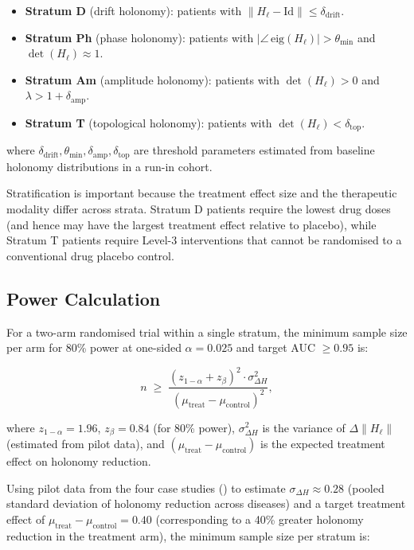 \begin{itemize}
  \item \textbf{Stratum D} (drift holonomy): patients with $\|H_\ell - \mathrm{Id}\| \leq \delta_{\mathrm{drift}}$.
  \item \textbf{Stratum Ph} (phase holonomy): patients with $|\angle\,\mathrm{eig}(H_\ell)| > \theta_{\mathrm{min}}$ and $\det(H_\ell) \approx 1$.
  \item \textbf{Stratum Am} (amplitude holonomy): patients with $\det(H_\ell) > 0$ and $\lambda > 1 + \delta_{\mathrm{amp}}$.
  \item \textbf{Stratum T} (topological holonomy): patients with $\det(H_\ell) < \delta_{\mathrm{top}}$.
\end{itemize}

\noindent where $\delta_{\mathrm{drift}}, \theta_{\mathrm{min}}, \delta_{\mathrm{amp}},
\delta_{\mathrm{top}}$ are threshold parameters estimated from baseline
holonomy distributions in a run-in cohort.

Stratification is important because the treatment effect size and the
therapeutic modality differ across strata.  Stratum D patients require the
lowest drug doses (and hence may have the largest treatment effect relative to
placebo), while Stratum T patients require Level-3 interventions that cannot
be randomised to a conventional drug placebo control.

\subsection{Power Calculation}

For a two-arm randomised trial within a single stratum, the minimum sample size
per arm for 80\% power at one-sided $\alpha = 0.025$ and target AUC
$\geq 0.95$ is:

\begin{equation}
  \label{eq:ch10-power}
  n \;\geq\;
  \frac{(z_{1-\alpha} + z_{\beta})^2 \cdot \sigma^2_{\Delta H}}{(\mu_{\mathrm{treat}} - \mu_{\mathrm{control}})^2},
\end{equation}

\noindent where $z_{1-\alpha} = 1.96$, $z_\beta = 0.84$ (for 80\% power),
$\sigma^2_{\Delta H}$ is the variance of $\Delta\|H_\ell\|$ (estimated from
pilot data), and $(\mu_{\mathrm{treat}} - \mu_{\mathrm{control}})$ is the
expected treatment effect on holonomy reduction.

Using pilot data from the four case studies () to
estimate $\sigma_{\Delta H} \approx 0.28$ (pooled standard deviation of
holonomy reduction across diseases) and a target treatment effect of
$\mu_{\mathrm{treat}} - \mu_{\mathrm{control}} = 0.40$ (corresponding to a
40\% greater holonomy reduction in the treatment arm), the minimum sample
size per stratum is:

